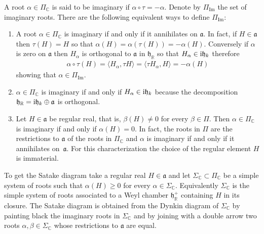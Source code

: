 \documentclass[10pt,a4paper]{amsart}
\numberwithin{equation}{section}
\newcommand{\func}[1]{\operatorname{#1}}
\begin{document}
A root $\alpha \in \Pi _{\mathbb{C}}$ is said to be imaginary if $\alpha\circ \tau =-\alpha $. Denote by $\Pi _{\func{Im}}$ the set of imaginary roots. There are the following equivalent ways to define $\Pi _{\func{Im}}$:

\begin{enumerate}\itemsep=0pt
\item A root $\alpha \in \Pi _{\mathbb{C}}$ is imaginary if and only if it annihilates on $\mathfrak{a}$. In fact, if $H\in \mathfrak{a}$ then $\tau(H) =H$ so that $\alpha (H) =\alpha ( \tau (H)) =-\alpha (H) $. Conversely if $\alpha $ is zero on $\mathfrak{a}$ then $H_{\alpha }$ is orthogonal to $\mathfrak{a}$ in $\mathfrak{h}_{\mathbb{R}}$ so that $H_{\alpha }\in {\rm i}\mathfrak{h}_{k}$ therefore
\begin{gather*}
\alpha \circ \tau (H) =\langle H_{\alpha },\tau H\rangle=\langle \tau H_{\alpha },H\rangle =-\alpha (H)
\end{gather*}
showing that $\alpha \in \Pi _{\func{Im}}$.

\item $\alpha \in \Pi _{\mathbb{C}}$ is imaginary if and only if $H_{\alpha}\in {\rm i}\mathfrak{h}_{k}$ because the decomposition $\mathfrak{h}_{\mathbb{R}}={\rm i}\mathfrak{h}_{k}\oplus \mathfrak{a}$ is orthogonal.

\item Let $H\in \mathfrak{a}$ be regular real, that is, $\beta (H ) \neq 0$ for every $\beta \in \Pi $. Then $\alpha \in \Pi _{\mathbb{C}}$ is imaginary if and only if $\alpha (H) =0$. In fact, the roots in $\Pi $ are the restrictions to $\mathfrak{a}$ of the roots in $\Pi_{\mathbb{C}}$ and $\alpha $ is imaginary if and only if it annihilates on~$\mathfrak{a}$. For this characterization the choice of the regular element $H $ is immaterial.
\end{enumerate}

To get the Satake diagram take a regular real $H\in \mathfrak{a}$ and let $\Sigma _{\mathbb{C}}\subset \Pi _{\mathbb{C}}$ be a simple system of roots such that $\alpha (H) \geq 0$ for every $\alpha \in \Sigma _{\mathbb{C}}$. Equivalently $\Sigma _{\mathbb{C}}$ is the simple system of roots associated to a Weyl chamber $\mathfrak{h}_{\mathbb{R}}^{+}$ containing $H$ in its closure. The Satake diagram is obtained from the Dynkin diagram of $\Sigma _{\mathbb{C}}$ by painting black the imaginary roots in $\Sigma _{\mathbb{C}}$ and by joining with a double arrow two roots $\alpha,\beta \in \Sigma _{\mathbb{C}}$ whose restrictions to $\mathfrak{a}$ are equal.
\end{document}
